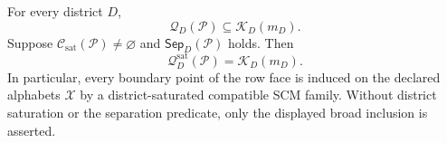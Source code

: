 For every district \(D\),
\[
\mathcal Q_D(\mathcal P)\subseteq\mathcal K_D(m_D).
\]
Suppose \(\mathcal C_{\mathrm{sat}}(\mathcal P)\ne\varnothing\) and \(\mathsf{Sep}_D(\mathcal P)\) holds. Then
\[
\mathcal Q_D^{\mathrm{sat}}(\mathcal P)=\mathcal K_D(m_D).
\]
In particular, every boundary point of the row face is induced on the declared alphabets \(\mathcal X\) by a district-saturated compatible SCM family. Without district saturation or the separation predicate, only the displayed broad inclusion is asserted.